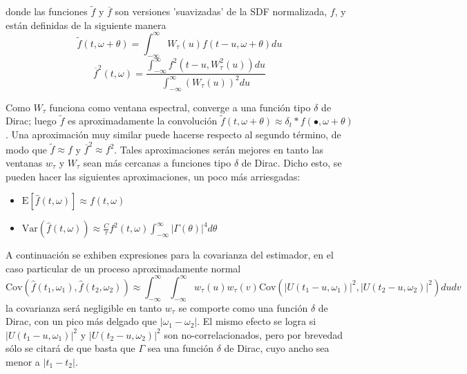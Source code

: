 \documentclass[12pt,a4paper]{mitthesis}
\newcommand{\intR}{\int_{-\infty}^{\infty}}
\newcommand{\dirac}{$\delta$  de Dirac}
\newcommand{\est}[1]{\widehat{ #1 }}
\newcommand{\E}[1]{\mathrm{E}\left[ #1 \right]}
\newcommand{\Var}[1]{\mathrm{Var}\left( #1 \right)}
\newcommand{\Cov}[1]{\mathrm{Cov}\left( #1 \right)}
\newcommand{\abso}[1]{\left| #1 \right|}
\begin{document}
donde las funciones $\widetilde{f}$ y $\overline{f}$ son versiones 'suavizadas' de la SDF 
normalizada, $f$, y est\'an definidas de la siguiente manera
\begin{equation*}
\widetilde{f}(t,\omega+\theta) = 
\intR W_{\tau}(u) f(t-u,\omega+\theta) du
\end{equation*}
\begin{equation*}
\overline{f}^{2} (t,\omega) =
\frac{\intR f^{2}\left(t-u,W_{\tau}^{2}(u)\right) du}
{\intR \left( W_{\tau}(u) \right)^{2} du}
\end{equation*}

Como $W_{\tau}$ funciona como ventana espectral, converge a una 
funci\'on tipo \dirac; luego $\widetilde{f}$ es aproximadamente la convoluci\'on 
$\widetilde{f}(t,\omega+\theta) \approx \delta_t \ast f(\bullet,\omega+\theta)$. 
Una aproximaci\'on muy similar 
puede hacerse respecto al segundo t\'ermino, de modo que $\widetilde{f}\approx f$ y 
$\overline{f}^{2}\approx f^{2}$.
Tales aproximaciones ser\'an mejores en tanto las ventanas $w_{\tau}$ y $W_{\tau}$ sean m\'as 
cercanas a funciones tipo \dirac.
Dicho esto, se pueden hacer las siguientes aproximaciones, un poco m\'as arriesgadas:
\begin{itemize}
\item $\displaystyle \E{\est{f}(t,\omega)} \approx f(t,\omega)$
\item $\displaystyle \Var{\est{f}(t,\omega)} \approx 
\frac{C}{\tau} f^{2}(t,\omega) \intR \abso{\Gamma (\theta)}^{4} d\theta$
\end{itemize}

A continuaci\'on se exhiben expresiones para la covarianza del estimador, en el caso particular
de un proceso aproximadamente normal
\begin{equation*}
\Cov{\est{f}(t_1,\omega_1) , \est{f}(t_2,\omega_2)} \approx \intR \intR
w_\tau (u) w_\tau(v) \Cov{ \abso{U(t_1-u,\omega_1)}^{2} , \abso{U(t_2-u,\omega_2)}^{2} }
du dv
\end{equation*}
la covarianza ser\'a negligible en tanto $w_\tau$ se comporte como una 
funci\'on \dirac, con un pico m\'as delgado que $\abso{\omega_1-\omega_2}$.
El mismo efecto se logra si $\abso{U(t_1-u,\omega_1)}^{2}$ y $\abso{U(t_2-u,\omega_2)}^{2}$ son 
no-correlacionados, pero por brevedad s\'olo se citar\'a de \cite{Priestley65} que basta que 
$\Gamma$ sea una funci\'on \dirac, cuyo ancho sea menor a $\abso{t_1-t_2}$.
\end{document}
